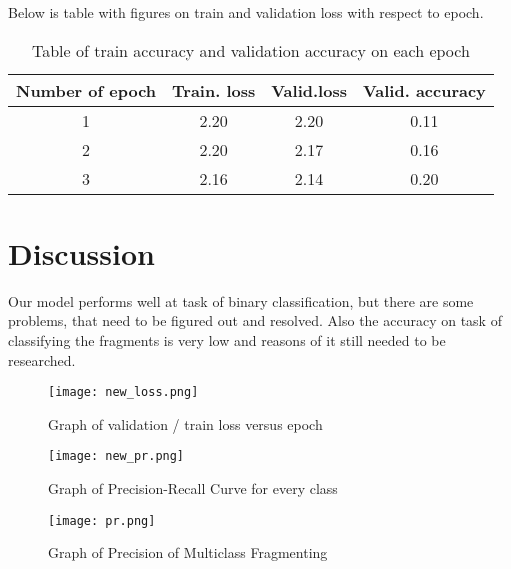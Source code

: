\documentclass{article}
\begin{document}
Below is table with figures on train and validation loss with respect to epoch.
\begin{table}[bhtp]
	\centering
	\caption{Table of train accuracy and validation accuracy on each epoch}
	\label{tbl:space_and_subspace}
	\begin{tabular}{| c | c | c | c | }
		\hline
		Number of epoch & Train. loss & Valid.loss & Valid. accuracy \\
		\hline
		1 & 2.20  & 2.20 & 0.11  \\
        \hline
		2 & 2.20 & 2.17 & 0.16  \\
		\hline
        3 & 2.16  & 2.14 & 0.20 \\
        \hline
	\end{tabular}
\end{table}

\section{Discussion}

Our model performs well at task of binary classification, but there are some problems, that need to be figured out and resolved. Also the accuracy on task of classifying the fragments is very low and reasons of it still needed to be researched. 


\begin{figure}[bhtp]
	\texttt{[image: new\_loss.png]}
	\caption{Graph of validation / train loss versus epoch}
	\label{fig:1}
\end{figure}


\begin{figure}[bhtp]
	\texttt{[image: new\_pr.png]}
	\caption{Graph of Precision-Recall Curve for every class}
	\label{fig:2}
\end{figure}

\begin{figure}[bhtp]
	\texttt{[image: pr.png]}
	\caption{Graph of Precision of Multiclass Fragmenting}
	\label{fig:3}
\end{figure}
\end{document}
